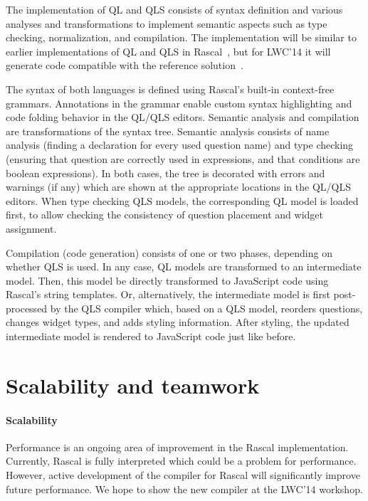 \documentclass[a4paper]{article}
\begin{document}
The implementation of QL and QLS consists of syntax definition and
various analyses and transformations to implement semantic aspects
such as type checking, normalization, and compilation. The
implementation will be similar to earlier implementations of QL and
QLS in Rascal~\cite{QLRKemi,Demoqles}, but for LWC'14 it will generate
code compatible with the reference solution~\cite{ReferenceImpl}.

The syntax of both languages is defined using Rascal's built-in
context-free grammars. Annotations in the grammar enable custom syntax
highlighting and code folding behavior in the QL/QLS editors. Semantic
analysis and compilation are transformations of the syntax tree.
Semantic analysis consists of name analysis (finding a declaration for
every used question name) and type checking (ensuring that question
are correctly used in expressions, and that conditions are boolean
expressions). In both cases, the tree is decorated with errors and
warnings (if any) which are shown at the appropriate locations in the
QL/QLS editors. When type checking QLS models, the corresponding QL
model is loaded first, to allow checking the consistency of question
placement and widget assignment. 

Compilation (code generation) consists of one or two phases, depending
on whether QLS is used. In any case, QL models are transformed to an
intermediate model. Then, this model be directly transformed to
JavaScript code using Rascal's string templates. Or, alternatively,
the intermediate model is first post-processed by the QLS compiler
which, based on a QLS model, reorders questions, changes widget types,
and adds styling information. After styling, the updated intermediate model
is rendered to JavaScript code just like before. 



\section{Scalability and teamwork}

\paragraph{Scalability}
Performance is an ongoing area of improvement in the Rascal
implementation. Currently, Rascal is fully interpreted which could be
a problem for performance. However, active development of the compiler
for Rascal will significantly improve future performance. We hope to
show the new compiler at the LWC'14 workshop. 
\end{document}
